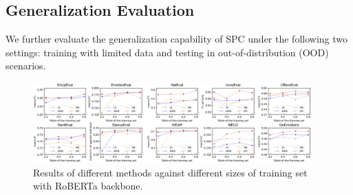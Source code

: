 \documentclass[letterpaper]{article} %
\begin{document}
\subsection{Generalization Evaluation}
We further evaluate the generalization capability of SPC under the following two settings: training with limited data and testing in out-of-distribution (OOD) scenarios.


\begin{figure}[t]
\centering
\includegraphics[width=0.95\textwidth]{figures/data_per.png}  
\caption{Results of different methods against different sizes of training set with RoBERTa backbone.}
\label{fig:training}
\end{figure}



\begin{table}[t]
\centering
{}
\caption{Out-of-distribution evaluation results (\%).  
For instance, ``EmotionEval $\rightarrow$ GoEmotions" refers to training the model on the training set of EmotionEval and making predictions using the test set of GoEmotions.
We experiment with RoBERTa backbone.
We run five random seeds and report the average results on test sets of target domains. Labels that do not appear in the training corpus are not evaluated. 
}
\label{tab:ood-performance}
\end{table}
\end{document}
